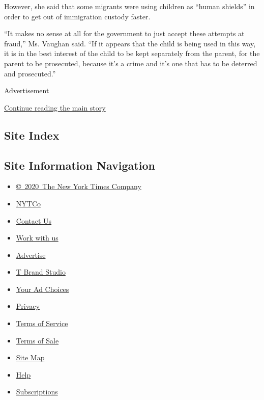 However, she said that some migrants were using children as ``human
shields'' in order to get out of immigration custody faster.

``It makes no sense at all for the government to just accept these
attempts at fraud,'' Ms. Vaughan said. ``If it appears that the child is
being used in this way, it is in the best interest of the child to be
kept separately from the parent, for the parent to be prosecuted,
because it's a crime and it's one that has to be deterred and
prosecuted.''

Advertisement

\protect\hyperlink{after-bottom}{Continue reading the main story}

\hypertarget{site-index}{%
\subsection{Site Index}\label{site-index}}

\hypertarget{site-information-navigation}{%
\subsection{Site Information
Navigation}\label{site-information-navigation}}

\begin{itemize}
\tightlist
\item
  \href{https://help.nytimes3xbfgragh.onion/hc/en-us/articles/115014792127-Copyright-notice}{©~2020~The
  New York Times Company}
\end{itemize}

\begin{itemize}
\tightlist
\item
  \href{https://www.nytco.com/}{NYTCo}
\item
  \href{https://help.nytimes3xbfgragh.onion/hc/en-us/articles/115015385887-Contact-Us}{Contact
  Us}
\item
  \href{https://www.nytco.com/careers/}{Work with us}
\item
  \href{https://nytmediakit.com/}{Advertise}
\item
  \href{http://www.tbrandstudio.com/}{T Brand Studio}
\item
  \href{https://www.nytimes3xbfgragh.onion/privacy/cookie-policy\#how-do-i-manage-trackers}{Your
  Ad Choices}
\item
  \href{https://www.nytimes3xbfgragh.onion/privacy}{Privacy}
\item
  \href{https://help.nytimes3xbfgragh.onion/hc/en-us/articles/115014893428-Terms-of-service}{Terms
  of Service}
\item
  \href{https://help.nytimes3xbfgragh.onion/hc/en-us/articles/115014893968-Terms-of-sale}{Terms
  of Sale}
\item
  \href{https://spiderbites.nytimes3xbfgragh.onion}{Site Map}
\item
  \href{https://help.nytimes3xbfgragh.onion/hc/en-us}{Help}
\item
  \href{https://www.nytimes3xbfgragh.onion/subscription?campaignId=37WXW}{Subscriptions}
\end{itemize}
